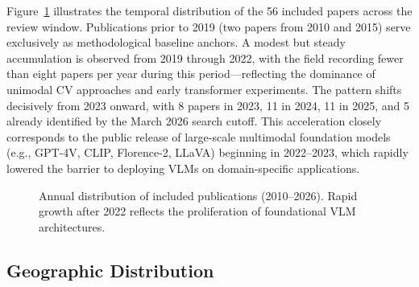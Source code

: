 \documentclass[10pt,letterpaper]{article}
\begin{document}
Figure~\ref{fig:pubyear} illustrates the temporal distribution of the 56 included papers across the review window. Publications prior to 2019 (two papers from 2010 and 2015) serve exclusively as methodological baseline anchors. A modest but steady accumulation is observed from 2019 through 2022, with the field recording fewer than eight papers per year during this period---reflecting the dominance of unimodal CV approaches and early transformer experiments. The pattern shifts decisively from 2023 onward, with 8 papers in 2023, 11 in 2024, 11 in 2025, and 5 already identified by the March 2026 search cutoff. This acceleration closely corresponds to the public release of large-scale multimodal foundation models (e.g., GPT-4V, CLIP, Florence-2, LLaVA) beginning in 2022--2023, which rapidly lowered the barrier to deploying VLMs on domain-specific applications.

\begin{figure}[H]
\caption{Annual distribution of included publications (2010--2026). Rapid growth after 2022 reflects the proliferation of foundational VLM architectures.}
\label{fig:pubyear}
\centering
{}
\end{figure}

\subsection{Geographic Distribution}
\end{document}
